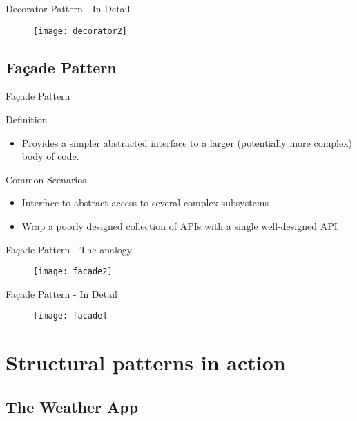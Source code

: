 \documentclass{beamer}
\begin{document}
\begin{frame}{Decorator Pattern - In Detail}
    \begin{figure}[htp]
    \centering
    \texttt{[image: decorator2]}
    \label{fig:decorator2}
    \end{figure}
\end{frame}

\subsection{Fa\c{c}ade Pattern}
\begin{frame}{Fa\c{c}ade Pattern}
  \begin{block}{Definition}
   \begin{itemize}
    \item {Provides a simpler abstracted interface to a larger (potentially more complex) body of code.}
   \end{itemize}
  \end{block}
  \pause
  \begin{block}{Common Scenarios}
   \begin{itemize}
    \item { Interface to abstract access to several complex subsystems }
    \item { Wrap a poorly designed collection of APIs with a single well-designed API }
   \end{itemize}
  \end{block}
\end{frame}

\begin{frame}{Fa\c{c}ade Pattern - The analogy}
    \begin{figure}[htp]
    \centering
    \texttt{[image: facade2]}
    \label{fig:facade}
    \end{figure}
\end{frame}


\begin{frame}{Fa\c{c}ade Pattern - In Detail}
    \begin{figure}[htp]
    \centering
    \texttt{[image: facade]}
    \label{fig:facade2}
    \end{figure}
\end{frame}

\section{Structural patterns in action}
\subsection{The Weather App}
\end{document}
